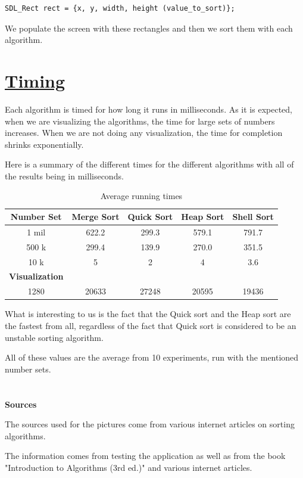 \documentclass{article}
\begin{document}
\begin{lstlisting}
SDL_Rect rect = {x, y, width, height (value_to_sort)};
\end{lstlisting}

We populate the screen with these rectangles and then we sort them with each algorithm.

\section{\underline{Timing}}

Each algorithm is timed for how long it runs in milliseconds. As it is expected, when we are visualizing the algorithms, the time for large sets of numbers increases. When we are not doing any visualization, the time for completion shrinks exponentially.

Here is a summary of the different times for the different algorithms with all of the results being in milliseconds.

\begin{table}[H]
  \begin{center}
    \label{tab:Average running times}
    \begin{tabular}{c|c|c|c|c}
      \toprule
      \textbf{Number Set} & \textbf{Merge Sort} & \textbf{Quick Sort} & \textbf{Heap Sort} & \textbf{Shell Sort} \\
      \midrule
      1 mil & 622.2 & 299.3 & 579.1 & 791.7 \\
      500 k & 299.4 & 139.9 & 270.0 & 351.5 \\
      10 k & 5 & 2 & 4 & 3.6 \\
      \bottomrule
      \toprule
      \textbf{Visualization} \\
      1280 & 20633 & 27248 & 20595 & 19436 \\
    \end{tabular}
    \caption{Average running times}
  \end{center}
\end{table}

What is interesting to us is the fact that the Quick sort and the Heap sort are the fastest from all, regardless of the fact that Quick sort is considered to be an unstable sorting algorithm.

All of these values are the average from 10 experiments, run with the mentioned number sets.
\\
\\
\\
\textbf{Sources}

The sources used for the pictures come from various internet articles on sorting algorithms.

The information comes from testing the application as well as from the book "Introduction to Algorithms (3rd ed.)" and various internet articles.
\end{document}
